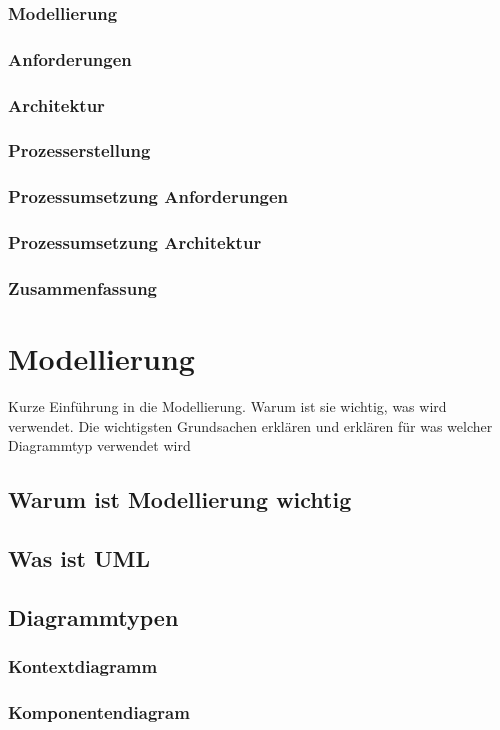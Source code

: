 \documentclass[Master,MSE,german]{twbook}
\begin{document}
\subsection{Modellierung}
\subsection{Anforderungen}
\subsection{Architektur}
\subsection{Prozesserstellung}
\subsection{Prozessumsetzung Anforderungen}
\subsection{Prozessumsetzung Architektur}
\subsection{Zusammenfassung}


\chapter{Modellierung}
Kurze Einführung in die Modellierung. Warum ist sie wichtig, was wird verwendet. Die wichtigsten Grundsachen erklären und erklären für was welcher Diagrammtyp verwendet wird

\section{Warum ist Modellierung wichtig}
\section{Was ist UML}

\section{Diagrammtypen}
\subsection{Kontextdiagramm}
\subsection{Komponentendiagram}
\end{document}
